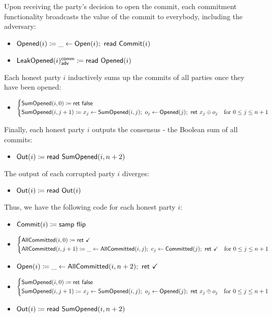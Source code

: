 Upon receiving the party's decision to open the commit, each commitment functionality broadcasts the value of the commit to everybody, including the adversary:
\begin{itemize}
\item {\color{red} $\mathsf{Opened}(i) \coloneqq \_ \leftarrow \mathsf{Open}(i); \ \mathsf{read} \ \mathsf{Commit}(i)$}
\item {\color{red} $\mathsf{LeakOpened}(i)^{\mathsf{comm}}_{\mathsf{adv}} \coloneqq \mathsf{read} \ \mathsf{Opened}(i)$}
\end{itemize}
Each honest party $i$ inductively sums up the commits of all parties once they have been opened:
\begin{itemize}
\item {\color{red} $\begin{cases*} \SumOpened(i,0) \coloneqq \ret{\false} & \\ \SumOpened(i,j+1) \coloneqq x_j \leftarrow \SumOpened(i,j); \ o_j \leftarrow \Opened(j); \ \ret{x_j \oplus o_j} & \text{for $0 \leq j \leq n+1$} \end{cases*}$}
\end{itemize}
Finally, each honest party $i$ outputs the consensus - the Boolean sum of all commits:
\begin{itemize}
\item $\mathsf{Out}(i) \coloneqq \mathsf{read} \ \mathsf{SumOpened}(i,n+2)$
\end{itemize}
The output of each corrupted party $i$ diverges:
\begin{itemize}
\item $\mathsf{Out}(i) \coloneqq \mathsf{read} \ \mathsf{Out}(i)$
\end{itemize}
Thus, we have the following code for each honest party $i$:
\begin{itemize}
\item {\color{blue} $\mathsf{Commit}(i) \coloneqq \mathsf{samp} \ \mathsf{flip}$}
\item {\color{magenta} $\begin{cases*} \AllCommitted(i,0) \coloneqq \ret{\checkmark} & \\ \AllCommitted(i,j+1) \coloneqq \_ \leftarrow \AllCommitted(i,j); \ c_j \leftarrow \Committed(j); \ \ret{\checkmark} & \text{for $0 \leq j \leq n+1$} \end{cases*}$}
\item {\color{teal} $\Open(i) \coloneqq \_ \leftarrow \AllCommitted(i,n+2); \ \ret{\checkmark}$}
\item {\color{red} $\begin{cases*} \SumOpened(i,0) \coloneqq \ret{\false} & \\ \SumOpened(i,j+1) \coloneqq x_j \leftarrow \SumOpened(i,j); \ o_j \leftarrow \Opened(j); \ \ret{x_j \oplus o_j} & \text{for $0 \leq j \leq n+1$} \end{cases*}$}
\item $\mathsf{Out}(i) \coloneqq \mathsf{read} \ \mathsf{SumOpened}(i,n+2)$
\end{itemize}
